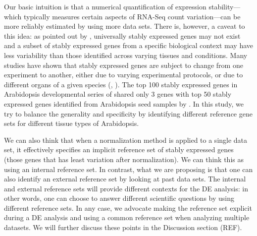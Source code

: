 \documentclass[11pt, a4paper]{article}
\begin{document}
Our basic intuition is that a numerical quantification of expression
stability---which typically measures certain aspects of RNA-Seq count
variation---can be more reliably estimated by using more data sets.  There is,
however, a caveat to this idea: as pointed out by \cite{hruz2011refgenes},
universally stably expressed genes may not exist and a subset of stably
expressed genes from a specific biological context may have less variability
than those identified across varying tissues and conditions.  Many studies
have shown that stably expressed genes are subject to change from one
experiment to another, either due to varying experimental protocols, or due to
different organs of a given species (\cite{reid2006optimized},
\cite{hong2010identification}).  The top 100 stably expressed genes in  Arabidopsis developmental series of \cite{czechowski2005genome} shared only 3 genes with top 50 stably expressed
genes identified from Arabidopsis seed samples by \cite{dekkers2012identification}.  In this
study, we try to balance the generality and specificity by identifying different
reference gene sets for different tissue types of Arabidopsis. 

We can also think that when a normalization method is applied to a single data
set, it effectively specifies an implicit reference set of stably expressed
genes (those genes that has least variation after normalization). We can think
this as using an internal reference set. In contrast, what we are proposing is
that one can also identify an external reference set by looking at past data
sets. The internal and external reference sets will provide different contexts
for the DE analysis: in other words, one can choose to answer different
scientific questions by using different reference sets. In any case, we
advocate  making the reference set explicit during a DE analysis and using a
common reference set when analyzing multiple datasets. We will further discuss
these points in the Discussion section (REF).
\end{document}
